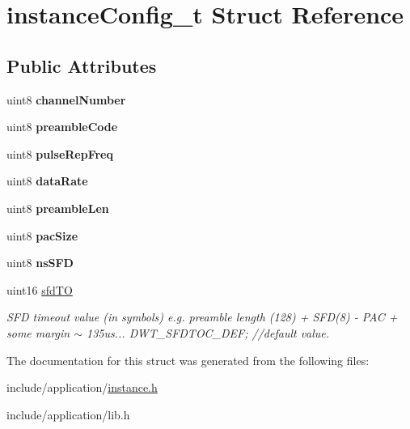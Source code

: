 \hypertarget{structinstanceConfig__t}{\section{instance\-Config\-\_\-t Struct Reference}
\label{structinstanceConfig__t}
}
\subsection*{Public Attributes}
\begin{DoxyCompactItemize}
\item 
\hypertarget{structinstanceConfig__t_ae9c416a4e984de5976480b54f0f96d94}{uint8 {\bfseries channel\-Number}}\label{structinstanceConfig__t_ae9c416a4e984de5976480b54f0f96d94}

\item 
\hypertarget{structinstanceConfig__t_a916d08693a8b4c815cbb541157918a7d}{uint8 {\bfseries preamble\-Code}}\label{structinstanceConfig__t_a916d08693a8b4c815cbb541157918a7d}

\item 
\hypertarget{structinstanceConfig__t_a1705a3ef855410d280b381f6d1b12df6}{uint8 {\bfseries pulse\-Rep\-Freq}}\label{structinstanceConfig__t_a1705a3ef855410d280b381f6d1b12df6}

\item 
\hypertarget{structinstanceConfig__t_a8402d974d9ef9827311a51a7782d24e3}{uint8 {\bfseries data\-Rate}}\label{structinstanceConfig__t_a8402d974d9ef9827311a51a7782d24e3}

\item 
\hypertarget{structinstanceConfig__t_aa385fd2017bb17e85aafa0d07fb1bdfa}{uint8 {\bfseries preamble\-Len}}\label{structinstanceConfig__t_aa385fd2017bb17e85aafa0d07fb1bdfa}

\item 
\hypertarget{structinstanceConfig__t_a22ea9c0122eb182a4bb4eb6ecd49ea01}{uint8 {\bfseries pac\-Size}}\label{structinstanceConfig__t_a22ea9c0122eb182a4bb4eb6ecd49ea01}

\item 
\hypertarget{structinstanceConfig__t_afcd9b380b3ad9a096fbd863c97dc6893}{uint8 {\bfseries ns\-S\-F\-D}}\label{structinstanceConfig__t_afcd9b380b3ad9a096fbd863c97dc6893}

\item 
\hypertarget{structinstanceConfig__t_a14d4d1b2850d8572f214dda6d8cf17ba}{uint16 \hyperlink{structinstanceConfig__t_a14d4d1b2850d8572f214dda6d8cf17ba}{sfd\-T\-O}}\label{structinstanceConfig__t_a14d4d1b2850d8572f214dda6d8cf17ba}

\begin{DoxyCompactList}\small\item\em S\-F\-D timeout value (in symbols) e.\-g. preamble length (128) + S\-F\-D(8) -\/ P\-A\-C + some margin $\sim$ 135us... D\-W\-T\-\_\-\-S\-F\-D\-T\-O\-C\-\_\-\-D\-E\-F; //default value. \end{DoxyCompactList}\end{DoxyCompactItemize}


The documentation for this struct was generated from the following files\-:\begin{DoxyCompactItemize}
\item 
include/application/\hyperlink{instance_8h}{instance.\-h}\item 
include/application/lib.\-h\end{DoxyCompactItemize}
